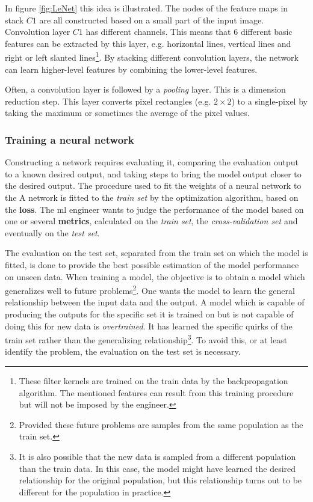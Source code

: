 \par{
    In figure \ref{fig:LeNet} this idea is illustrated. 
    The nodes of the feature maps in stack $C1$ are all constructed based on a small part of the input image.
    Convolution layer $C1$ has different channels. 
    This means that 6 different basic features can be extracted by this layer, e.g. horizontal lines, vertical lines and right or left slanted lines\footnote{
        These filter kernels are trained on the train data by the backpropagation algorithm. The mentioned features can result from this training procedure but will not be imposed by the engineer.
        }.
    By stacking different convolution layers, the network can learn higher-level features by combining the lower-level features.
}
\par{
    Often, a convolution layer is followed by a \textit{pooling} layer. 
    This is a dimension reduction step.
    This layer converts pixel rectangles (e.g. $2\times 2$) to a single-pixel by taking the maximum or sometimes the average of the pixel values.
}



\subsubsection{Training a neural network}
\par{
    Constructing a network requires evaluating it, comparing the evaluation output to a known desired output, and taking steps to bring the model output closer to the desired output. 
    The procedure used to fit the weights of a neural network to the 
    A network is fitted to the \textit{train set} by the optimization algorithm, based on the \textbf{loss}.
    The \acrshort{ml} engineer wants to judge the performance of the model based on one or several \textbf{metrics}, calculated on the \textit{train set}, the \textit{cross-validation set} and eventually on the \textit{test set}.
}
\par{
    The evaluation on the test set, separated from the train set on which the model is fitted, is done to provide the best possible estimation of the model performance on unseen data.
    When training a model, the objective is to obtain a model which generalizes well to future problems\footnote{
        Provided these future problems are samples from the same population as the train set.
    }. One wants the model to learn the general relationship between the input data and the output.
    A model which is capable of producing the outputs for the specific set it is trained on but is not capable of doing this for new data is \textit{overtrained}.
    It has learned the specific quirks of the train set rather than the generalizing relationship\footnote{
        It is also possible that the new data is sampled from a different population than the train data.
        In this case, the model might have learned the desired relationship for the original population, but this relationship turns out to be different for the population in practice.
        }.
    To avoid this, or at least identify the problem, the evaluation on the test set is necessary.
}

